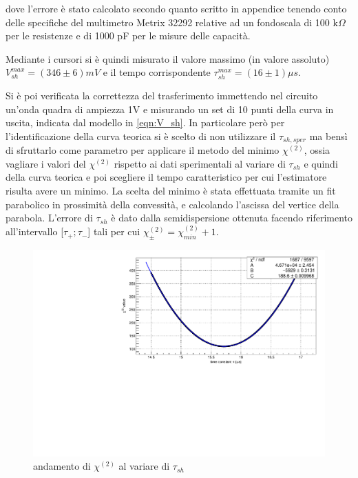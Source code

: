 \documentclass{article}
\begin{document}
dove l'errore è stato calcolato secondo quanto scritto in appendice tenendo conto delle specifiche del multimetro Metrix 32292 relative
ad un fondoscala di 100 k$\Omega$ per le resistenze e di 1000 pF per le misure delle capacità.

Mediante i cursori si è quindi misurato il valore massimo (in valore assoluto) $V_{sh}^{max}=(346 \pm 6)mV$ e il tempo corrispondente 
$\tau_{sh}^{max}=(16 \pm 1)\mu s$.

Si è poi verificata la correttezza del trasferimento immettendo nel circuito un'onda quadra di ampiezza 1V e misurando un set di 10 punti 
della curva in uscita, indicata dal modello in \ref{eqn:V_sh}. In particolare però per l'identificazione della curva teorica si è 
scelto di non utilizzare il $\tau_{sh,sper}$ ma bensì di sfruttarlo come parametro per applicare il metodo del minimo $\chi^{(2)}$, 
ossia vagliare i valori del $\chi^{(2)}$ rispetto ai dati sperimentali al variare di $\tau_{sh}$ e quindi
della curva teorica e poi scegliere il tempo caratteristico per cui l'estimatore risulta avere un minimo. 
La scelta del minimo è stata effettuata tramite un fit parabolico in prossimità della convessità, e calcolando l'ascissa del 
vertice della parabola.
L'errore di $\tau_{sh}$ è dato dalla semidispersione ottenuta facendo riferimento all'intervallo [$\tau_+ ; \tau_-$] 
tali per cui $\chi^{(2)}_{\pm} = \chi^{(2)}_{min} + 1$.

\begin{center}
    \begin{figure}[H]
    \centering
    \includegraphics[scale=0.375, angle=0]{chi_forma_no_pz.pdf}
    \caption{andamento di $\chi^{(2)}$ al variare di $\tau_{sh}$}
    \label{fig:chi_forma_no_pz}
    \end{figure}
\end{center}
\end{document}
